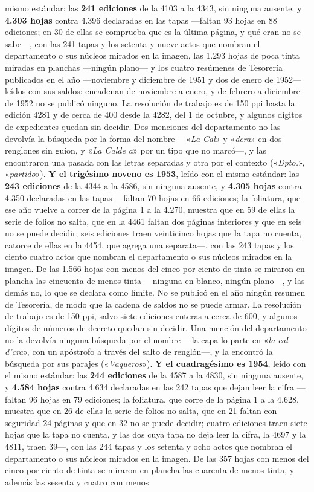 mismo estándar: las \textbf{241 ediciones} de la 4103 a la 4343, sin ninguna ausente, y \textbf{4.303 hojas} contra 4.396 declaradas en las tapas ---faltan 93 hojas en 88 ediciones; en 30 de ellas se comprueba que es la última página, y qué eran no se sabe---, con las 241 tapas y los setenta y nueve actos que nombran el departamento o sus núcleos mirados en la imagen, las 1.293 hojas de poca tinta miradas en planchas ---ningún plano--- y los cuatro resúmenes de Tesorería publicados en el año ---noviembre y diciembre de 1951 y dos de enero de 1952--- leídos con sus saldos: encadenan de noviembre a enero, y de febrero a diciembre de 1952 no se publicó ninguno. La resolución de trabajo es de 150 ppi hasta la edición 4281 y de cerca de 400 desde la 4282, del 1 de octubre, y algunos dígitos de expedientes quedan sin decidir. Dos menciones del departamento no las devolvía la búsqueda por la forma del nombre ---«\textit{La Cal}» y «\textit{dera}» en dos renglones sin guion, y «\textit{La Calde a}» por un tipo que no marcó---, y las encontraron una pasada con las letras separadas y otra por el contexto («\textit{Dpto.}», «\textit{partido}»). \textbf{Y el trigésimo noveno es 1953}, leído con el mismo estándar: las \textbf{243 ediciones} de la 4344 a la 4586, sin ninguna ausente, y \textbf{4.305 hojas} contra 4.350 declaradas en las tapas ---faltan 70 hojas en 66 ediciones; la foliatura, que ese año vuelve a correr de la página 1 a la 4.270, muestra que en 59 de ellas la serie de folios no salta, que en la 4461 faltan dos páginas interiores y que en seis no se puede decidir; seis ediciones traen veinticinco hojas que la tapa no cuenta, catorce de ellas en la 4454, que agrega una separata---, con las 243 tapas y los ciento cuatro actos que nombran el departamento o sus núcleos mirados en la imagen. De las 1.566 hojas con menos del cinco por ciento de tinta se miraron en plancha las cincuenta de menos tinta ---ninguna en blanco, ningún plano---, y las demás no, lo que se declara como límite. No se publicó en el año ningún resumen de Tesorería, de modo que la cadena de saldos no se puede armar. La resolución de trabajo es de 150 ppi, salvo siete ediciones enteras a cerca de 600, y algunos dígitos de números de decreto quedan sin decidir. Una mención del departamento no la devolvía ninguna búsqueda por el nombre ---la capa lo parte en «\textit{la cal d'cra}», con un apóstrofo a través del salto de renglón---, y la encontró la búsqueda por sus parajes («\textit{Vaqueros}»). \textbf{Y el cuadragésimo es 1954}, leído con el mismo estándar: las \textbf{244 ediciones} de la 4587 a la 4830, sin ninguna ausente, y \textbf{4.584 hojas} contra 4.634 declaradas en las 242 tapas que dejan leer la cifra ---faltan 96 hojas en 79 ediciones; la foliatura, que corre de la página 1 a la 4.628, muestra que en 26 de ellas la serie de folios no salta, que en 21 faltan con seguridad 24 páginas y que en 32 no se puede decidir; cuatro ediciones traen siete hojas que la tapa no cuenta, y las dos cuya tapa no deja leer la cifra, la 4697 y la 4811, traen 39---, con las 244 tapas y los setenta y ocho actos que nombran el departamento o sus núcleos mirados en la imagen. De las 357 hojas con menos del cinco por ciento de tinta se miraron en plancha las cuarenta de menos tinta, y además las sesenta y cuatro con menos 